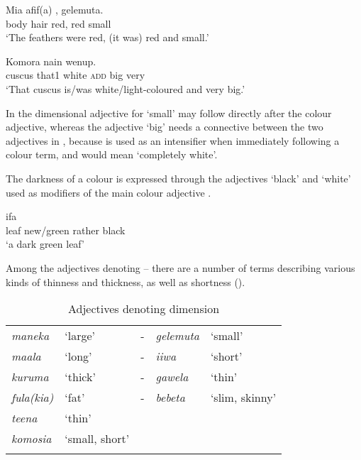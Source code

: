 \ea%
\label{ex:3:x1754}
\gll Mia afif(a) ,  gelemuta. \\
body hair red, red small\\
\glt`The feathers were red, (it was) red and small.'
\z

\ea%
\label{ex:3:x1755}
\gll Komora nain    wenup. \\
cuscus that1 white \textsc{add} big very\\
\glt`That cuscus is/was white/light-coloured and very big.'
\z

In  the dimensional adjective for `small' may follow directly after the colour adjective, whereas the adjective  `big' needs a connective between the two adjectives in , because  is used as an intensifier when immediately following a colour term, and  would mean `completely white'.

The darkness of a colour is expressed through the adjectives  `black' and  `white' used as modifiers of the main colour adjective .

\ea%
\label{ex:3:x110}
\gll ifa    \\
leaf new/green rather black\\
\glt`a dark green leaf'
\z

Among the adjectives denoting  -- there are a number of terms describing various kinds of thinness and thickness, as well as shortness (). 

\begin{table}
\caption{Adjectives denoting dimension}
\label{tab:3:dimensionadj}
 
\begin{tabular}{>{\itshape}llc>{\itshape}ll}
\mytoprule
maneka &`large' &- &gelemuta &`small'\\
maala &`long' &- &iiwa &`short'\\
kuruma &`thick' &- &gawela &`thin'\\
fula(kia) &`fat' &- &bebeta &`slim, skinny'\\
teena &`thin'&&&\\
komosia &`small, short'&&&\\
\mybottomrule
\end{tabular}
\end{table}

